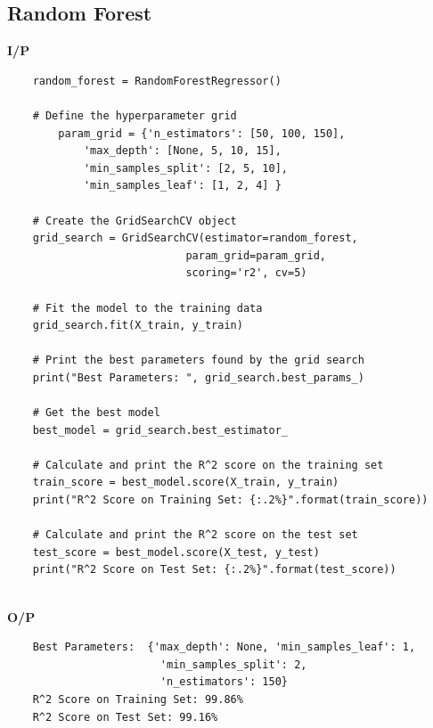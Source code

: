 \subsection{Random Forest}
\noindent
\textbf{I/P} \\[-1.5em]
\begin{verbatim}
    random_forest = RandomForestRegressor() 
 
    # Define the hyperparameter grid 
        param_grid = {'n_estimators': [50, 100, 150], 
            'max_depth': [None, 5, 10, 15], 
            'min_samples_split': [2, 5, 10], 
            'min_samples_leaf': [1, 2, 4] } 
 
    # Create the GridSearchCV object 
    grid_search = GridSearchCV(estimator=random_forest,
                            param_grid=param_grid,
                            scoring='r2', cv=5) 
 
    # Fit the model to the training data 
    grid_search.fit(X_train, y_train) 
 
    # Print the best parameters found by the grid search 
    print("Best Parameters: ", grid_search.best_params_) 
 
    # Get the best model 
    best_model = grid_search.best_estimator_ 
 
    # Calculate and print the R^2 score on the training set 
    train_score = best_model.score(X_train, y_train) 
    print("R^2 Score on Training Set: {:.2%}".format(train_score)) 
 
    # Calculate and print the R^2 score on the test set 
    test_score = best_model.score(X_test, y_test) 
    print("R^2 Score on Test Set: {:.2%}".format(test_score)) 
\end{verbatim}
\\
\noindent
\textbf{O/P} \\[-1.5em]
\begin{verbatim}
    Best Parameters:  {'max_depth': None, 'min_samples_leaf': 1,
                        'min_samples_split': 2,
                        'n_estimators': 150} 
    R^2 Score on Training Set: 99.86% 
    R^2 Score on Test Set: 99.16%   
\end{verbatim}

